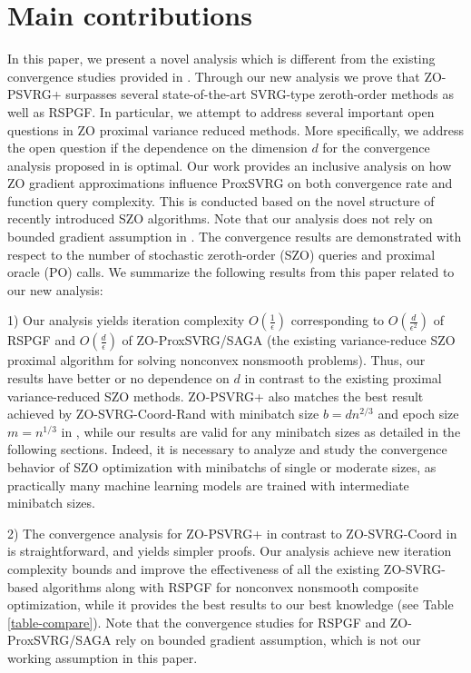 \section{Main contributions}
In this paper, we present a novel analysis which is different from the existing convergence studies provided in \cite{liu2018zeroth,ji2019improved}. Through  our new analysis we prove that ZO-PSVRG+  surpasses several state-of-the-art SVRG-type zeroth-order methods as well as RSPGF. In particular, we attempt to address several important open questions in ZO proximal variance reduced methods. More specifically, we address the open question if the dependence on the dimension $d$ for the convergence analysis proposed in \cite{liu2018zeroth} is optimal. Our work provides an inclusive analysis on how ZO gradient approximations influence ProxSVRG on both  convergence rate and function query complexity. This
is conducted based on the novel structure of recently introduced SZO algorithms.
Note that our analysis does not rely on bounded gradient assumption in \cite{ghadimi2016accelerated,huang2019faster}.
The convergence results are demonstrated with respect to the number of stochastic zeroth-order (SZO) queries and proximal oracle (PO) calls. 
We summarize the following results from this paper related to our new analysis:

1) Our analysis yields iteration complexity $O(\frac{1}{{\epsilon}})$ corresponding to $O(\frac{d}{\epsilon^2})$ of RSPGF \cite{ghadimi2016accelerated}  and $O(\frac{d}{\epsilon})$ of ZO-ProxSVRG/SAGA  \cite{huang2019faster} (the existing variance-reduce SZO proximal algorithm for solving nonconvex nonsmooth problems).  
Thus, our results have better or no dependence on
$d$ in contrast to the existing proximal variance-reduced SZO methods. ZO-PSVRG+ also matches the best result achieved by ZO-SVRG-Coord-Rand with minibatch size $b = d n^{2/3}$ and epoch size $m = n^{1/3}$ in \cite{ji2019improved}, while our results are valid for any minibatch sizes as detailed in the following sections.  
Indeed, it is necessary to analyze and study the convergence behavior of SZO optimization with minibatchs of single or moderate sizes, as practically many machine learning models are trained with intermediate minibatch sizes.


2) The convergence analysis for ZO-PSVRG+ in contrast to  ZO-SVRG-Coord in \cite{liu2018zeroth,ji2019improved} is straightforward, and yields simpler proofs. Our analysis achieve new iteration complexity bounds and improve the effectiveness of  all the existing ZO-SVRG-based algorithms along with RSPGF for nonconvex nonsmooth composite optimization, while it provides the best results to our best knowledge (see Table \ref{table-compare}). Note that the convergence studies for RSPGF and ZO-ProxSVRG/SAGA rely on bounded gradient assumption, which is not our working assumption in this paper.


